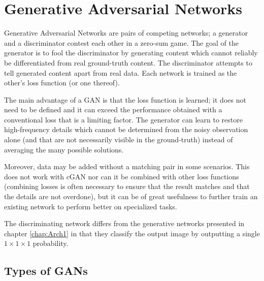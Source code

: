 \chapter{Generative Adversarial Networks}\label{chap:Arch2}

Generative Adversarial Networks are pairs of competing networks; a generator and a discriminator contest each other in a zero-sum game. The goal of the generator is to fool the discriminator by generating content which cannot reliably be differentiated from real ground-truth content. The discriminator attempts to tell generated content apart from real data. Each network is trained as the other's loss function (or one thereof).

The main advantage of a \acl{GAN} is that the loss function is learned; it does not need to be defined and it can exceed the performance obtained with a conventional loss that is a limiting factor. The generator can learn to restore high-frequency details which cannot be determined from the noisy observation alone (and that are not necessarily visible in the ground-truth) instead of averaging the many possible solutions.

Moreover, data may be added without a matching pair in some scenarios. This does not work with \acl{cGAN} nor can it be combined with other loss functions (combining losses is often necessary to ensure that the result matches and that the details are not overdone), but it can be of great usefulness to further train an existing network to perform better on specialized tasks.

The discriminating network differs from the generative networks presented in chapter \ref{chap:Arch1} in that they classify the output image by outputting a single $1\times 1 \times 1$ probability.

\section{Types of GANs}

